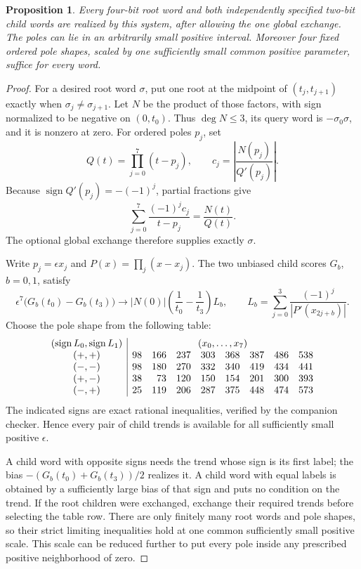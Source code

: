 \documentclass[11pt]{article}
\newtheorem{proposition}{Proposition}
\begin{document}
\begin{proposition}
Every four-bit root word and both independently specified two-bit
child words are realized by this system, after allowing the one global
exchange. The poles can lie in an arbitrarily small positive interval.
Moreover four fixed ordered pole shapes, scaled by one sufficiently
small common positive parameter, suffice for every word.
\end{proposition}
\begin{proof}
For a desired root word $\sigma$, put one root at the midpoint of
$(t_j,t_{j+1})$ exactly when $\sigma_j\ne\sigma_{j+1}$. Let $N$ be
the product of those factors, with sign normalized to be negative on
$(0,t_0)$. Thus $\deg N\leq3$, its query word is $-\sigma_0\sigma$,
and it is nonzero at zero. For ordered poles $p_j$, set
\[
 Q(t)=\prod_{j=0}^7(t-p_j),\qquad
 c_j=\left|\frac{N(p_j)}{Q'(p_j)}\right|.
\]
Because $\operatorname{sign}Q'(p_j)=-(-1)^j$, partial fractions give
\[
 \sum_{j=0}^7\frac{(-1)^j c_j}{t-p_j}=\frac{N(t)}{Q(t)}.
\]
The optional global exchange therefore supplies exactly $\sigma$.

Write $p_j=\epsilon x_j$ and $P(x)=\prod_j(x-x_j)$. The two
unbiased child scores $G_b$, $b=0,1$, satisfy
\[
 \epsilon^7\bigl(G_b(t_0)-G_b(t_3)\bigr)
 \longrightarrow
 |N(0)|\left(\frac1{t_0}-\frac1{t_3}\right)L_b,
 \qquad
 L_b=\sum_{j=0}^3\frac{(-1)^j}{|P'(x_{2j+b})|}.
\]
Choose the pole shape from the following table:
\[
\begin{array}{c|rrrrrrrr}
 (\operatorname{sign}L_0,\operatorname{sign}L_1)&\multicolumn{8}{c}{(x_0,\ldots,x_7)}\\
 (+,+)&98&166&237&303&368&387&486&538\\
 (-,-)&98&180&270&332&340&419&434&441\\
 (+,-)&38&73&120&150&154&201&300&393\\
 (-,+)&25&119&206&287&375&448&474&573
\end{array}
\]
The indicated signs are exact rational inequalities, verified by the
companion checker. Hence every pair of child trends is available for
all sufficiently small positive $\epsilon$.

A child word with opposite signs needs the trend whose sign is its
first label; the bias $-(G_b(t_0)+G_b(t_3))/2$ realizes it. A child
word with equal labels is obtained by a sufficiently large bias of
that sign and puts no condition on the trend. If the root children
were exchanged, exchange their required trends before selecting the
table row. There are only finitely many root words and pole shapes,
so their strict limiting inequalities hold at one common sufficiently
small positive scale. This scale can be reduced further to put every
pole inside any prescribed positive neighborhood of zero.
\end{proof}
\end{document}
